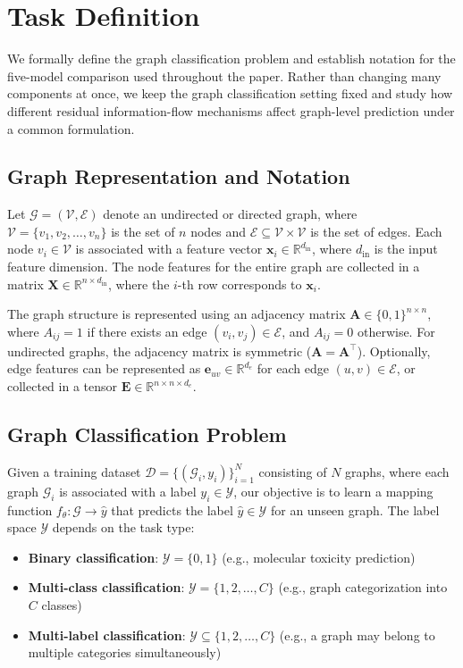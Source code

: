 \section{Task Definition}
\label{sec:task}

We formally define the graph classification problem and establish notation for the five-model comparison used throughout the paper. Rather than changing many components at once, we keep the graph classification setting fixed and study how different residual information-flow mechanisms affect graph-level prediction under a common formulation.

\subsection{Graph Representation and Notation}

Let $\mathcal{G} = (\mathcal{V}, \mathcal{E})$ denote an undirected or directed graph, where $\mathcal{V} = \{v_1, v_2, \ldots, v_n\}$ is the set of $n$ nodes and $\mathcal{E} \subseteq \mathcal{V} \times \mathcal{V}$ is the set of edges. Each node $v_i \in \mathcal{V}$ is associated with a feature vector $\mathbf{x}_i \in \mathbb{R}^{d_{\text{in}}}$, where $d_{\text{in}}$ is the input feature dimension. The node features for the entire graph are collected in a matrix $\mathbf{X} \in \mathbb{R}^{n \times d_{\text{in}}}$, where the $i$-th row corresponds to $\mathbf{x}_i$.

The graph structure is represented using an adjacency matrix $\mathbf{A} \in \{0,1\}^{n \times n}$, where $A_{ij} = 1$ if there exists an edge $(v_i, v_j) \in \mathcal{E}$, and $A_{ij} = 0$ otherwise. For undirected graphs, the adjacency matrix is symmetric ($\mathbf{A} = \mathbf{A}^\top$). Optionally, edge features can be represented as $\mathbf{e}_{uv} \in \mathbb{R}^{d_e}$ for each edge $(u,v) \in \mathcal{E}$, or collected in a tensor $\mathbf{E} \in \mathbb{R}^{n \times n \times d_e}$.

\subsection{Graph Classification Problem}

Given a training dataset $\mathcal{D} = \{(\mathcal{G}_i, y_i)\}_{i=1}^{N}$ consisting of $N$ graphs, where each graph $\mathcal{G}_i$ is associated with a label $y_i \in \mathcal{Y}$, our objective is to learn a mapping function $f_\theta: \mathcal{G} \rightarrow \hat{y}$ that predicts the label $\hat{y} \in \mathcal{Y}$ for an unseen graph. The label space $\mathcal{Y}$ depends on the task type:
\begin{itemize}
    \item \textbf{Binary classification}: $\mathcal{Y} = \{0, 1\}$ (e.g., molecular toxicity prediction)
    \item \textbf{Multi-class classification}: $\mathcal{Y} = \{1, 2, \ldots, C\}$ (e.g., graph categorization into $C$ classes)
    \item \textbf{Multi-label classification}: $\mathcal{Y} \subseteq \{1, 2, \ldots, C\}$ (e.g., a graph may belong to multiple categories simultaneously)
\end{itemize}

